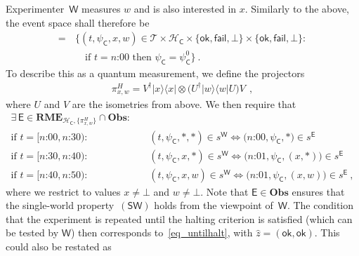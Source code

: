 \documentclass{article}
\theoremstyle{plain}
\theoremstyle{definition}
\newcommand*{\cH}{\mathcal{H}}
\newcommand*{\cT}{\mathcal{T}}
\newcommand{\proj}[1]{|#1\rangle\!\langle #1|}
\newcommand*{\Exp}{\mathsf{E}}
\newcommand*{\Wigner}{\mathsf{W}}
\newcommand*{\Coin}{\mathsf{C}}
\newcommand*{\BOE}{\mathbf{Obs}}
\newcommand*{\RME}{\mathbf{RME}}
\newcommand*{\SW}{\mathsf{(SW)}}
\newcommand*{\ok}{\mathsf{ok}}
\newcommand*{\fail}{\mathsf{fail}}
\begin{document}
Experimenter~$\Wigner$ measures $w$ and is also interested in $x$. Similarly to the above, the event space shall therefore be
\begin{align}
      [\Wigner] = \, & \bigl\{(t, \psi_{\Coin}, x, w)  \in \cT \times \cH_\Coin \times \{\ok, \fail, \bot\} \times  \{\ok, \fail, \bot\} : \nonumber \\ & \quad \text{if } t = \text{$n$:00} \text{ then } \psi_{\Coin} = \psi_{\Coin}^0 \label{eq_Wignerpsi} \bigr\}  \ .
\end{align}
To describe this as a quantum measurement, we define the projectors
\begin{align*}
  \pi^{H}_{x, w} = V^{\dagger} \proj{x} \otimes \bigl(U^{\dagger} \proj{w} U \bigr) V \ \ ,
\end{align*}
where $U$ and $V$ are the isometries from above. We then require that 
  \begin{align} \label{eq_WignerM}
 \exists \,  \Exp \in \RME_{\cH_{\Coin}, \{\pi^H_{x, w}\}} \cap \BOE:  \\ 
 \text{if $t = [\text{$n$:00}, \text{$n$:30}$)} : & \quad  (t, \psi_\Coin, *, *) \in s^{\Wigner}  \iff \bigl(\text{$n$:00}, \psi_{\Coin}, * \bigr) \in s^{\Exp} \nonumber \\ 
    \text{if $t = [\text{$n$:30}, \text{$n$:40}$)} : & \quad  (t, \psi_\Coin, x, *) \in s^{\Wigner}  \iff \bigl(\text{$n$:01}, \psi_{\Coin}, (x,*) \bigr) \in s^{\Exp}  \nonumber \\
    \text{if $t = [\text{$n$:40}, \text{$n$:50}$)} : & \quad  (t, \psi_\Coin, x, w) \in s^{\Wigner}   \iff \bigl(\text{$n$:01}, \psi_{\Coin}, (x, w)\bigr) \in s^{\Exp} \ ,\nonumber 
\end{align}
where we restrict to values $x \neq \bot$ and $w \neq \bot$. 
Note that $\Exp \in \BOE$ ensures that the single-world property~$\SW$ holds from the viewpoint of~$\Wigner$. The condition that the experiment is repeated until the halting criterion  is satisfied (which can be tested by $\Wigner$) then corresponds to~\eqref{eq_untilhalt}, with $\hat{z} = (\ok, \ok)$. This could also be restated as
\end{document}
